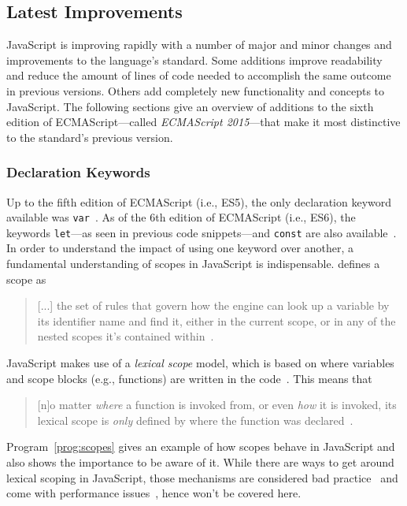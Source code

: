 \subsection{Latest Improvements}
\label{sec:latest-improvements}

JavaScript is improving rapidly with a number of major and minor changes and improvements to the language's standard. Some additions improve readability and reduce the amount of lines of code needed to accomplish the same outcome in previous versions. Others add completely new functionality and concepts to JavaScript. The following sections give an overview of additions to the sixth edition of ECMAScript---called \emph{ECMAScript 2015}---that make it most distinctive to the standard's previous version.

\subsubsection{Declaration Keywords}

Up to the fifth edition of ECMAScript (i.e., ES5), the only declaration keyword available was \texttt{var}~\cite[p.~87]{ES5Spec:Ecma:2015}. As of the 6th edition of ECMAScript (i.e., ES6), the keywords \texttt{let}---as seen in previous code snippets---and \texttt{const} are also available~\cite[p.~194]{ES6Spec:Ecma:2015}. In order to understand the impact of using one keyword over another, a fundamental understanding of scopes in JavaScript is indispensable. \citeauthor{YDKJS:ScopesAndClosures:Simpson:2014} defines a scope as 
\begin{quote}
  [...] the set of rules that govern how the engine can look up a variable by its identifier name and find it, either in the current scope, or in any of the nested scopes it’s contained within~\cite[p.~13]{YDKJS:ScopesAndClosures:Simpson:2014}.
\end{quote}
JavaScript makes use of a \emph{lexical scope} model, which is based on where variables and scope blocks (e.g., functions) are written in the code~\cite[p.~13]{YDKJS:ScopesAndClosures:Simpson:2014}. This means that 
\begin{quote}
  [n]o matter \emph{where} a function is invoked from, or even \emph{how} it is invoked, its lexical scope is \emph{only} defined by where the function was declared~\cite[p.~16]{YDKJS:ScopesAndClosures:Simpson:2014}.
\end{quote}
Program~\ref{prog:scopes} gives an example of how scopes behave in JavaScript and also shows the importance to be aware of it. While there are ways to get around lexical scoping in JavaScript, those mechanisms are considered bad practice~\cite[p.~14]{YDKJS:ScopesAndClosures:Simpson:2014} and come with performance issues~\cite[p.~21]{YDKJS:ScopesAndClosures:Simpson:2014}, hence won't be covered here.

